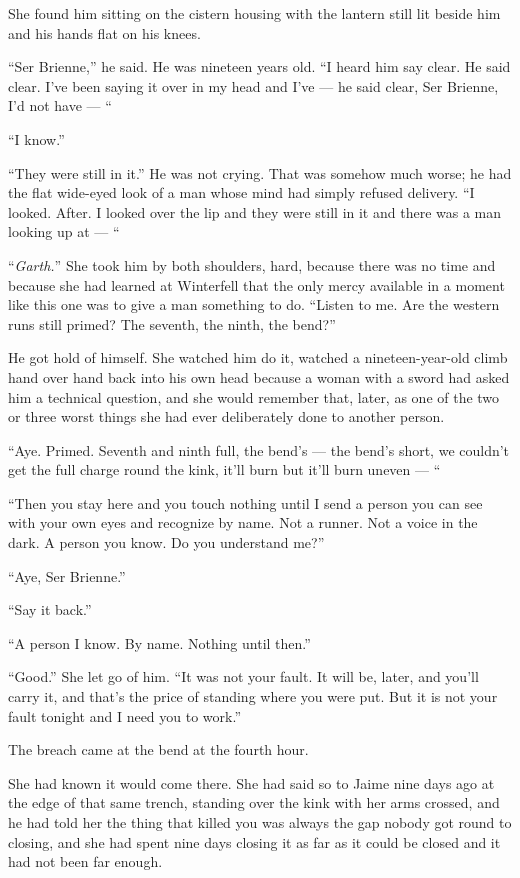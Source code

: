 She found him sitting on the cistern housing with the lantern still lit beside him and his hands flat on his knees.

“Ser Brienne,” he said. He was nineteen years old. “I heard him say clear. He said clear. I’ve been saying it over in my head and I’ve — he said clear, Ser Brienne, I’d not have — “

“I know.”

“They were still in it.” He was not crying. That was somehow much worse; he had the flat wide-eyed look of a man whose mind had simply refused delivery. “I looked. After. I looked over the lip and they were still in it and there was a man looking up at — “

“\textit{Garth.}” She took him by both shoulders, hard, because there was no time and because she had learned at Winterfell that the only mercy available in a moment like this one was to give a man something to do. “Listen to me. Are the western runs still primed? The seventh, the ninth, the bend?”

He got hold of himself. She watched him do it, watched a nineteen-year-old climb hand over hand back into his own head because a woman with a sword had asked him a technical question, and she would remember that, later, as one of the two or three worst things she had ever deliberately done to another person.

“Aye. Primed. Seventh and ninth full, the bend’s — the bend’s short, we couldn’t get the full charge round the kink, it’ll burn but it’ll burn uneven — “

“Then you stay here and you touch nothing until I send a person you can see with your own eyes and recognize by name. Not a runner. Not a voice in the dark. A person you know. Do you understand me?”

“Aye, Ser Brienne.”

“Say it back.”

“A person I know. By name. Nothing until then.”

“Good.” She let go of him. “It was not your fault. It will be, later, and you’ll carry it, and that’s the price of standing where you were put. But it is not your fault tonight and I need you to work.”

\sceneBreak

The breach came at the bend at the fourth hour.

She had known it would come there. She had said so to Jaime nine days ago at the edge of that same trench, standing over the kink with her arms crossed, and he had told her the thing that killed you was always the gap nobody got round to closing, and she had spent nine days closing it as far as it could be closed and it had not been far enough.

